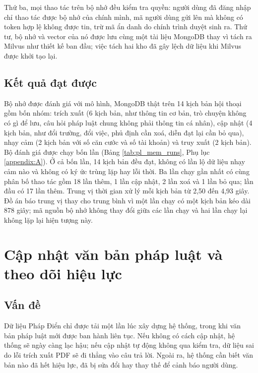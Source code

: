 \documentclass[../DoAn.tex]{subfiles}
\begin{document}
Thứ ba, mọi thao tác trên bộ nhớ đều kiểm tra quyền: người dùng đã đăng nhập chỉ thao tác được bộ nhớ của chính mình, mã người dùng gửi lên mà không có token hợp lệ không được tin, trừ mã ẩn danh do chính trình duyệt sinh ra. Thứ tư, bộ nhớ và vector của nó được lưu cùng một tài liệu MongoDB thay vì tách ra Milvus như thiết kế ban đầu; việc tách hai kho đã gây lệch dữ liệu khi Milvus được khởi tạo lại.

\subsection{Kết quả đạt được}
Bộ nhớ được đánh giá với mô hình, MongoDB thật trên 14 kịch bản hội thoại gồm bốn nhóm: trích xuất (6 kịch bản, như thông tin cơ bản, trò chuyện không có gì để lưu, câu hỏi pháp luật chung không phải thông tin cá nhân), cập nhật (4 kịch bản, như đổi trường, đổi việc, phủ định cần xoá, diễn đạt lại cần bỏ qua), nhạy cảm (2 kịch bản với số căn cước và số tài khoản) và truy xuất (2 kịch bản). Bộ đánh giá được chạy bốn lần (Bảng \ref{tab:pl_mem_runs}, Phụ lục \ref{appendix:A}). Ở cả bốn lần, 14 kịch bản đều đạt, không có lần lộ dữ liệu nhạy cảm nào và không có ký ức trùng lặp hay lỗi thời. Ba lần chạy gần nhất có cùng phân bố thao tác gồm 18 lần thêm, 1 lần cập nhật, 2 lần xoá và 1 lần bỏ qua; lần đầu có 17 lần thêm. Trung vị thời gian xử lý mỗi kịch bản từ 2,50 đến 4,93 giây. Đồ án báo trung vị thay cho trung bình vì một lần chạy có một kịch bản kéo dài 878 giây; mã nguồn bộ nhớ không thay đổi giữa các lần chạy và hai lần chạy lại không lặp lại hiện tượng này.

\section{Cập nhật văn bản pháp luật và theo dõi hiệu lực}
\label{section:5.5}

\subsection{Vấn đề}
Dữ liệu Pháp Điển chỉ được tải một lần lúc xây dựng hệ thống, trong khi văn bản pháp luật mới được ban hành liên tục. Nếu không có cách cập nhật, hệ thống sẽ ngày càng lạc hậu; nếu cập nhật tự động không qua kiểm tra, dữ liệu sai do lỗi trích xuất PDF sẽ đi thẳng vào câu trả lời. Ngoài ra, hệ thống cần biết văn bản nào đã hết hiệu lực, đã bị sửa đổi hay thay thế để cảnh báo người dùng.
\end{document}
